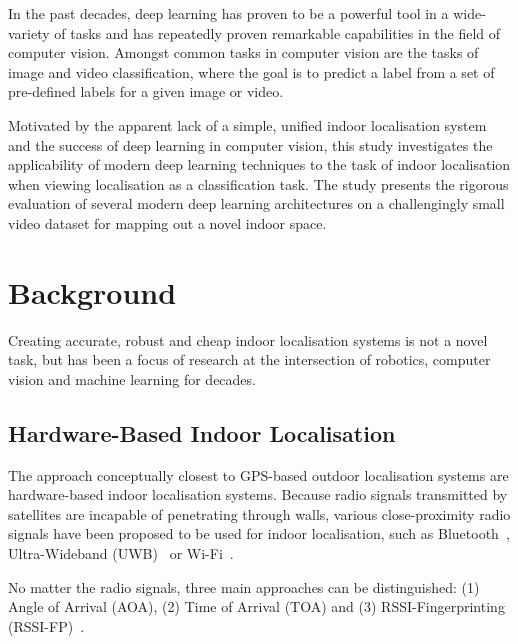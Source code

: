 \documentclass[a4paper]{article}
\begin{document}
  In the past decades, deep learning has proven to be a powerful tool in a
  wide-variety of tasks and has repeatedly proven remarkable capabilities in the
  field of computer vision. Amongst common tasks in computer vision are the tasks
  of image and video classification, where the goal is to predict a label from a
  set of pre-defined labels for a given image or video.

  Motivated by the apparent lack of a simple, unified indoor localisation system
  and the success of deep learning in computer vision, this study investigates
  the applicability of modern deep learning techniques to the task of indoor
  localisation when viewing localisation as a classification task. The study
  presents the rigorous evaluation of several modern deep learning architectures
  on a challengingly small video dataset for mapping out a novel indoor space.


  \section{Background} %
  \label{sec:background}

  Creating accurate, robust and cheap indoor localisation systems is not a novel
  task, but has been a focus of research at the intersection of robotics,
  computer vision and machine learning for decades.

  \subsection{Hardware-Based Indoor Localisation} %
  \label{sub:hardware-based-indoor-localisation}

  The approach conceptually closest to GPS-based outdoor localisation systems
  are hardware-based indoor localisation systems. Because radio signals
  transmitted by satellites are incapable of penetrating through walls, various
  close-proximity radio signals have been proposed to be used for indoor
  localisation, such as Bluetooth~\cite{bluetooth1, bluetooth2}, Ultra-Wideband
  (UWB)~\cite{uwb1, uwb2} or Wi-Fi~\cite{survey1, survey2}.

  No matter the radio signals, three main approaches can be distinguished:
  (1) Angle of Arrival (AOA), (2) Time of Arrival (TOA) and (3)
  RSSI-Fingerprinting (RSSI-FP)~\cite{survey2}. 
\end{document}
